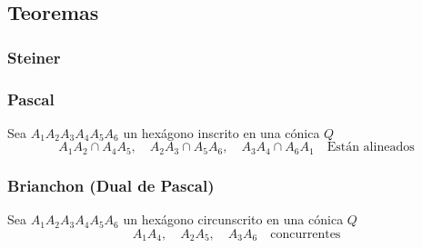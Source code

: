 \documentclass[leqno]{article}
\begin{document}
\subsection{Teoremas}
\subsubsection{Steiner}
\subsubsection{Pascal}
Sea $A_1A_2A_3A_4A_5A_6$ un hexágono inscrito en una cónica $Q$
 \[
   A_1A_2\cap A_4A_5, \quad A_2A_3\cap A_5A_6, \quad A_3A_4\cap A_6A_1 \quad \text{Están alineados}
\] 
\subsubsection{Brianchon (Dual de Pascal)}
Sea $A_1A_2A_3A_4A_5A_6$ un hexágono circunscrito en una cónica $Q$
\[
  A_1A_4, \quad A_2A_5, \quad A_3A_6 \quad \text{concurrentes}
\] 
\end{document}
